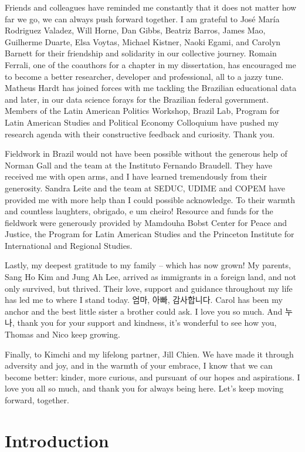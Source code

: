 \documentclass[12pt]{report}
\theoremstyle{definition}
\begin{document}
Friends and colleagues have reminded me constantly that it does not matter how far we go, we can always push forward together. I am grateful to Jos\'{e} Mar\'{i}a Rodriguez Valadez, Will Horne, Dan Gibbs, Beatriz Barros, James Mao, Guilherme Duarte, Elsa Voytas, Michael Kistner, Naoki Egami, and Carolyn Barnett for their friendship and solidarity in our collective journey. Romain Ferrali, one of the coauthors for a chapter in my dissertation, has encouraged me to become a better researcher, developer and professional, all to a jazzy tune. Matheus Hardt has joined forces with me tackling the Brazilian educational data and later, in our data science forays for the Brazilian federal government. Members of the Latin American Politics Workshop, Brazil Lab, Program for Latin American Studies and Political Economy Colloquium have pushed my research agenda with their constructive feedback and curiosity. Thank you.

Fieldwork in Brazil would not have been possible without the generous help of Norman Gall and the team at the Instituto Fernando Braudell. They have received me with open arms, and I have learned tremendously from their generosity. Sandra Leite and the team at SEDUC, UDIME and COPEM have provided me with more help than I could possible acknowledge. To their warmth and countless laughters, obrigado, e um cheiro! Resource and funds for the fieldwork were generously provided by Mamdouha Bobst Center for Peace and Justice, the Program for Latin American Studies and the Princeton Institute for International and Regional Studies.

Lastly, my deepest gratitude to my family -- which has now grown! My parents, Sang Ho Kim and Jung Ah Lee, arrived as immigrants in a foreign land, and not only survived, but thrived. Their love, support and guidance throughout my life has led me to where I stand today. 엄마, 아빠, 감사합니다. Carol has been my anchor and the best little sister a brother could ask. I love you so much. And 누나, thank you for your support and kindness, it's wonderful to see how you, Thomas and Nico keep growing.

Finally, to Kimchi and my lifelong partner, Jill Chien. We have made it through adversity and joy, and in the warmth of your embrace, I know that we can become better: kinder, more curious, and pursuant of our hopes and aspirations. I love you all so much, and thank you for always being here. Let's keep moving forward, together.

\newpage

\section*{Introduction}
\end{document}
